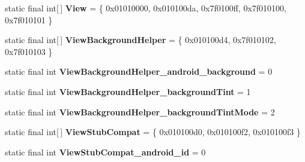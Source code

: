 \begin{DoxyCompactItemize}
\item 
\hypertarget{classandroid_1_1support_1_1v7_1_1appcompat_1_1_r_1_1styleable_a0105bc03f2606ae1fc5f05a515d81b3c}{}static final int\mbox{[}$\,$\mbox{]} {\bfseries View} = \{ 0x01010000, 0x010100da, 0x7f0100ff, 0x7f010100, 0x7f010101 \}\label{classandroid_1_1support_1_1v7_1_1appcompat_1_1_r_1_1styleable_a0105bc03f2606ae1fc5f05a515d81b3c}

\item 
\hypertarget{classandroid_1_1support_1_1v7_1_1appcompat_1_1_r_1_1styleable_a41b23c720259f27b563271bda1b5767a}{}static final int\mbox{[}$\,$\mbox{]} {\bfseries View\+Background\+Helper} = \{ 0x010100d4, 0x7f010102, 0x7f010103 \}\label{classandroid_1_1support_1_1v7_1_1appcompat_1_1_r_1_1styleable_a41b23c720259f27b563271bda1b5767a}

\item 
\hypertarget{classandroid_1_1support_1_1v7_1_1appcompat_1_1_r_1_1styleable_a5964669ca9aa4257bb4ee0b74c819596}{}static final int {\bfseries View\+Background\+Helper\+\_\+android\+\_\+background} = 0\label{classandroid_1_1support_1_1v7_1_1appcompat_1_1_r_1_1styleable_a5964669ca9aa4257bb4ee0b74c819596}

\item 
\hypertarget{classandroid_1_1support_1_1v7_1_1appcompat_1_1_r_1_1styleable_a0cb0c8e242c16e1370ae67bc0f2977e0}{}static final int {\bfseries View\+Background\+Helper\+\_\+background\+Tint} = 1\label{classandroid_1_1support_1_1v7_1_1appcompat_1_1_r_1_1styleable_a0cb0c8e242c16e1370ae67bc0f2977e0}

\item 
\hypertarget{classandroid_1_1support_1_1v7_1_1appcompat_1_1_r_1_1styleable_a6611327290a47817f92d3cd27e5ed123}{}static final int {\bfseries View\+Background\+Helper\+\_\+background\+Tint\+Mode} = 2\label{classandroid_1_1support_1_1v7_1_1appcompat_1_1_r_1_1styleable_a6611327290a47817f92d3cd27e5ed123}

\item 
\hypertarget{classandroid_1_1support_1_1v7_1_1appcompat_1_1_r_1_1styleable_a59b69ba1b80ee4157819f6b964a66358}{}static final int\mbox{[}$\,$\mbox{]} {\bfseries View\+Stub\+Compat} = \{ 0x010100d0, 0x010100f2, 0x010100f3 \}\label{classandroid_1_1support_1_1v7_1_1appcompat_1_1_r_1_1styleable_a59b69ba1b80ee4157819f6b964a66358}

\item 
\hypertarget{classandroid_1_1support_1_1v7_1_1appcompat_1_1_r_1_1styleable_a5321961e015b50c6ca753c1e84a8ad5d}{}static final int {\bfseries View\+Stub\+Compat\+\_\+android\+\_\+id} = 0\label{classandroid_1_1support_1_1v7_1_1appcompat_1_1_r_1_1styleable_a5321961e015b50c6ca753c1e84a8ad5d}


\end{DoxyCompactItemize}
